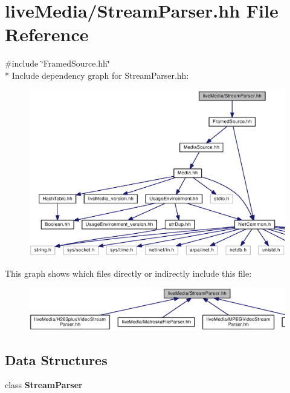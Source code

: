 \section{live\+Media/\+Stream\+Parser.hh File Reference}
\label{StreamParser_8hh}
{\ttfamily \#include \char`\"{}Framed\+Source.\+hh\char`\"{}}\\*
Include dependency graph for Stream\+Parser.\+hh\+:
\nopagebreak
\begin{figure}[H]
\begin{center}
\leavevmode
\includegraphics[width=350pt]{StreamParser_8hh__incl}
\end{center}
\end{figure}
This graph shows which files directly or indirectly include this file\+:
\nopagebreak
\begin{figure}[H]
\begin{center}
\leavevmode
\includegraphics[width=350pt]{StreamParser_8hh__dep__incl}
\end{center}
\end{figure}
\subsection*{Data Structures}
\begin{DoxyCompactItemize}
\item 
class {\bf Stream\+Parser}
\end{DoxyCompactItemize}
